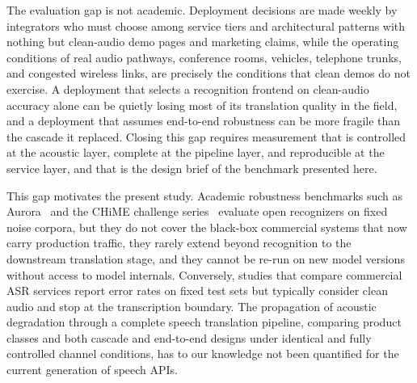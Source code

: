 The evaluation gap is not academic. Deployment decisions are made
weekly by integrators who must choose among service tiers and architectural
patterns with nothing but clean-audio demo pages and marketing claims, while
the operating conditions of real audio pathways, conference rooms, vehicles,
telephone trunks, and congested wireless links, are precisely the conditions
that clean demos do not exercise. A deployment that selects a recognition
frontend on clean-audio accuracy alone can be quietly losing most of its
translation quality in the field, and a deployment that assumes end-to-end
robustness can be more fragile than the cascade it replaced. Closing this
gap requires measurement that is controlled at the acoustic layer, complete
at the pipeline layer, and reproducible at the service layer, and that is
the design brief of the benchmark presented here.

This gap motivates the present study. Academic robustness benchmarks such as
Aurora~\cite{pearce2000aurora} and the CHiME challenge
series~\cite{barker2018fifth} evaluate open recognizers on fixed noise
corpora, but they do not cover the black-box commercial systems that now carry
production traffic, they rarely extend beyond recognition to the downstream
translation stage, and they cannot be re-run on new model versions without
access to model internals. Conversely, studies that compare commercial ASR
services report error rates on fixed test sets but typically consider clean
audio and stop at the transcription boundary. The propagation of acoustic
degradation through a complete speech translation pipeline, comparing
product classes and both cascade and end-to-end designs under
identical and fully controlled channel conditions, has to our knowledge not
been quantified for the current generation of speech APIs.

